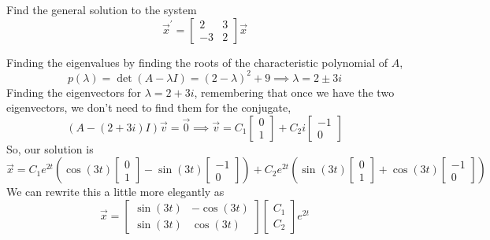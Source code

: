 \begin{example}
	Find the general solution to the system
	\begin{equation*}
		\vec{x}^\prime = \begin{bmatrix}
			2 & 3 \\
			-3 & 2
		\end{bmatrix} \vec{x}
	\end{equation*}
\end{example}
\noindent
Finding the eigenvalues by finding the roots of the characteristic polynomial of $A$,
\begin{equation*}
	p(\lambda) = \det{(A - \lambda I)} = (2-\lambda)^2 + 9 \implies \lambda = 2 \pm 3i
\end{equation*}
Finding the eigenvectors for $\lambda = 2 + 3i$, remembering that once we have the two eigenvectors, we don't need to find them for the conjugate,
\begin{equation*}
	(A - (2+3i)I)\vec{v} = \vec{0} \implies \vec{v} = C_1\begin{bmatrix}
		0 \\
		1
	\end{bmatrix} + C_2i\begin{bmatrix}
		-1 \\
		0
	\end{bmatrix}
\end{equation*}
So, our solution is
\begin{equation*}
	\vec{x} = C_1e^{2t}\left(\cos{(3t)}\begin{bmatrix}
		0 \\
		1
	\end{bmatrix}-\sin{(3t)}\begin{bmatrix}
		-1 \\
		0
	\end{bmatrix}\right) + C_2e^{2t}\left(\sin{(3t)}\begin{bmatrix}
		0 \\
		1
	\end{bmatrix}+\cos{(3t)}\begin{bmatrix}
		-1 \\
		0
	\end{bmatrix}\right)
\end{equation*}
We can rewrite this a little more elegantly as
\begin{equation*}
	\vec{x} = \begin{bmatrix}
		\sin{(3t)} & - \cos{(3t)} \\
		\sin{(3t)} & \cos{(3t)}
	\end{bmatrix} \begin{bmatrix}
		C_1 \\
		C_2
	\end{bmatrix} e^{2t}
\end{equation*}